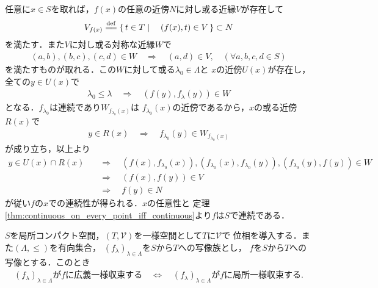 	\begin{prf}
		任意に$x \in S$を取れば，$f(x)$の任意の近傍$N$に対し或る近縁$V$が存在して
		\begin{align}
			V_{f(x)} \defeq \Set{t \in T}{(f(x),t) \in V} \subset N
		\end{align}
		を満たす．また$V$に対し或る対称な近縁$W$で
		\begin{align}
			(a,b),(b,c),(c,d) \in W \quad \Longrightarrow \quad
			(a,d) \in V,
			\quad (\forall a,b,c,d \in S)
		\end{align}
		を満たすものが取れる．この$W$に対して或る$\lambda_0 \in \Lambda$と
		$x$の近傍$U(x)$が存在し，全ての$y \in U(x)$で
		\begin{align}
			\lambda_0 \leq \lambda \quad \Longrightarrow \quad
			(f(y),f_\lambda(y)) \in W
		\end{align}
		となる．$f_{\lambda_0}$は連続であり$W_{f_{\lambda_0}(x)}$は
		$f_{\lambda_0}(x)$の近傍であるから，$x$の或る近傍$R(x)$で
		\begin{align}
			y \in R(x) \quad \Longrightarrow \quad
			f_{\lambda_0}(y) \in W_{f_{\lambda_0}(x)}
		\end{align}
		が成り立ち，以上より
		\begin{align}
			y \in U(x) \cap R(x) &\quad \Longrightarrow \quad
			(f(x),f_{\lambda_0}(x)),(f_{\lambda_0}(x),f_{\lambda_0}(y))
			,(f_{\lambda_0}(y),f(y)) \in W \\
			&\quad \Longrightarrow \quad (f(x),f(y)) \in V \\
			&\quad \Longrightarrow \quad f(y) \in N
		\end{align}
		が従い$f$の$x$での連続性が得られる．$x$の任意性と
		定理\ref{thm:continuous_on_every_point_iff_continuous}より$f$は$S$で連続である．
		\QED
	\end{prf}
	
	\begin{screen}
		\begin{thm}
		\label{thm:compact_unif_conv_iff_locally_unif_conv_if_locally_compact}
			$S$を局所コンパクト空間，$(T,\mathscr{V})$を一様空間として$T$に$\mathscr{V}$で
			位相を導入する．また$(\Lambda,\leq)$を有向集合，
			$(f_\lambda)_{\lambda \in \Lambda}$を$S$から$T$への写像族とし，
			$f$を$S$から$T$への写像とする．このとき
			\begin{align}
				\mbox{$(f_\lambda)_{\lambda \in \Lambda}$が$f$に広義一様収束する} 
				\quad \Longleftrightarrow \quad
				\mbox{$(f_\lambda)_{\lambda \in \Lambda}$が$f$に局所一様収束する}.
			\end{align}
		\end{thm}
	\end{screen}
	

